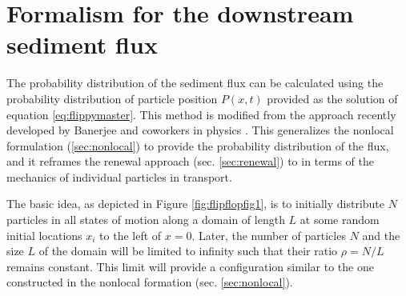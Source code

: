 \section{Formalism for the downstream sediment flux}
\label{sec:flippyflux}

The probability distribution of the sediment flux can be calculated using the probability distribution of particle position $P(x,t)$ provided as the solution of equation \ref{eq:flippymaster}.
This method is modified from the approach recently developed by Banerjee and coworkers in physics \citep{Banerjee2020}.
This generalizes the nonlocal formulation (\ref{sec:nonlocal}) to provide the probability distribution of the flux, and it reframes the renewal approach (sec. \ref{sec:renewal}) to in terms of the mechanics of individual particles in transport.

The basic idea, as depicted in Figure \ref{fig:flipflopfig1}, is to initially distribute $N$ particles in all states of motion along a domain of length $L$ at some random initial locations $x_i$ to the left of $x=0$.
Later, the number of particles $N$ and the size $L$ of the domain will be limited to infinity such that their ratio $\rho=N/L$ remains constant. 
This limit will provide a configuration similar to the one constructed in the nonlocal formation (sec. \ref{sec:nonlocal}).

